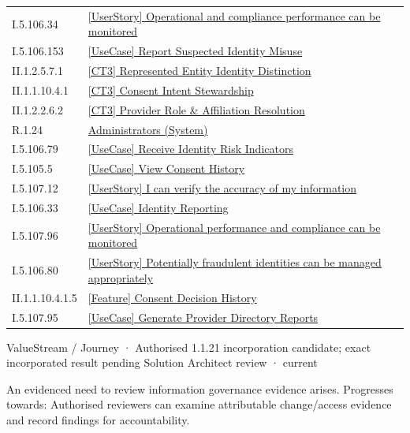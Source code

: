 \begin{longtable}{p{.22\linewidth}p{.73\linewidth}}
I.5.106.34 & \hyperref[element:c7f19646f4644390a2ce35df7cbe3252]{[UserStory] Operational and compliance performance can be monitored} \\
I.5.106.153 & \hyperref[element:c8af53b8d67d42fca361032ad0ba6e82]{[UseCase] Report Suspected Identity Misuse} \\
II.1.2.5.7.1 & \hyperref[element:d403533b88f243d0aa555a3a7566b5d1]{[CT3] Represented Entity Identity Distinction} \\
II.1.1.10.4.1 & \hyperref[element:d65ed66aba2542da87a321e7eeb274b9]{[CT3] Consent Intent Stewardship} \\
II.1.2.2.6.2 & \hyperref[element:dd0d16f6e6b9491c85deea915bb7bf4d]{[CT3] Provider Role \& Affiliation Resolution} \\
R.1.24 & \hyperref[element:ddeedc03593c4d658f6aa053d13767c5]{Administrators (System)} \\
I.5.106.79 & \hyperref[element:df7a868c530c4f5ba0b3be6f92626810]{[UseCase] Receive Identity Risk Indicators} \\
I.5.105.5 & \hyperref[element:e7d94e7f56f1406b946b0c7e10df95ac]{[UseCase] View Consent History} \\
I.5.107.12 & \hyperref[element:ea9ded05d14f4268978cbe0f06a08963]{[UserStory] I can verify the accuracy of my information} \\
I.5.106.33 & \hyperref[element:f7e0c3830dde44d097e342ce1129ff69]{[UseCase] Identity Reporting} \\
I.5.107.96 & \hyperref[element:f9d873d8a62e400d9a9854d894e1496d]{[UserStory] Operational performance and compliance can be monitored} \\
I.5.106.80 & \hyperref[element:fc8ea880a2f34f10ac79cd4a14d4fe9c]{[UserStory] Potentially fraudulent identities can be managed appropriately} \\
II.1.1.10.4.1.5 & \hyperref[element:fde94ec674194fdd83ebda1366b2dc4f]{[Feature] Consent Decision History} \\
I.5.107.95 & \hyperref[element:ff39e74a476f44fdb8e07c4ca9e38b73]{[UseCase] Generate Provider Directory Reports} \\
\end{longtable}
\label{element:558e014abfce4750996f92473380284d}
{\small ValueStream / Journey · Authorised 1.1.21 incorporation candidate; exact incorporated result pending Solution Architect review · current}\par

An evidenced need to review information governance evidence arises. Progresses towards: Authorised reviewers can examine attributable change/access evidence and record findings for accountability.



